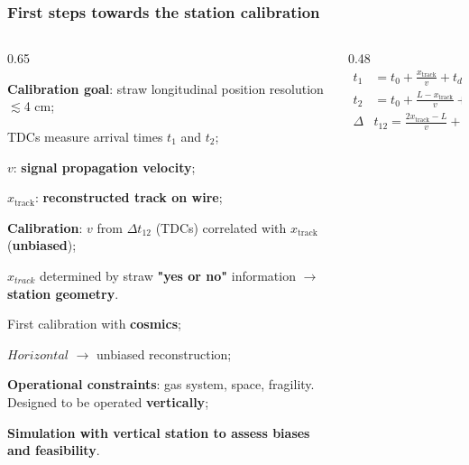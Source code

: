 \documentclass{beamer}
\begin{document}
\begin{frame}
    \frametitle{First steps towards the station calibration}
    
      \begin{columns}
        \begin{column}{0.65\framewidth}
                \setlength{\leftmargini}{1.2em}
                \vspace{-5mm}
            \begin{itemize}
             {\small 
             \item \textbf{Calibration goal}: straw longitudinal position resolution $\lesssim$4 cm;
             \vspace{0.5mm}
             \item TDCs measure arrival times $t_1$ and $t_2$;
             \vspace{0.5mm}

                \item $v$: \textbf{signal propagation velocity};
                \vspace{0.5mm}
    \item $x_{\text{track}}$: \textbf{reconstructed track on wire};
    \vspace{0.5mm}
                \item \textbf{Calibration}: $v$ from $\Delta t_{12}$ (TDCs) correlated with $x_{\text{track}}$ (\textbf{unbiased});
                \item $x_{track}$ determined by straw \textbf{"yes or no"} information $\rightarrow$ \textbf{station geometry}.                          
                } 
                {\small 
                \item First calibration with \textbf{cosmics};
                \vspace{0.5mm}
                \item $Horizontal$ $\rightarrow$ unbiased reconstruction; 
                               \vspace{0.5mm}
                \item \textbf{Operational constraints}: gas system, space, fragility. Designed to be operated \textbf{vertically};
                  \vspace{0.5mm}
                \item \textbf{Simulation with vertical station to assess biases and feasibility}.}  
            \end{itemize}
        \end{column}
        \begin{column}{0.48\framewidth}
            \begin{equation*}
\begin{aligned}
    t_1 &= t_0 + \frac{x_{\text{track}}}{v} + t_d + d_1 \\
    t_2 &= t_0 + \frac{L - x_{\text{track}}}{v} + t_d + d_2 \\
    \Delta & t_{12} = \frac{2x_{\text{track}}-L}{v} +(d_1-d_2)
\end{aligned}
\end{equation*}


\end{column}
\end{columns}
\end{frame}
\end{document}
